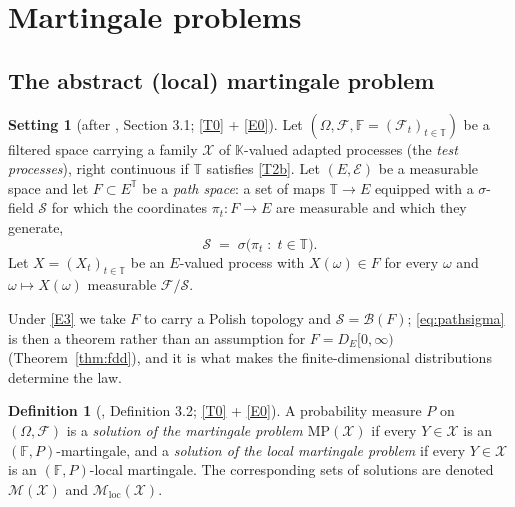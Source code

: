 \documentclass[11pt,a4paper]{article}
\theoremstyle{plain}
\theoremstyle{definition}
\newtheorem{definition}[theorem]{Definition}
\newtheorem{setting}[theorem]{Setting}
\theoremstyle{remark}
\newcommand{\T}{\mathbb{T}}                     %
\newcommand{\Bor}{\mathcal{B}}                 %
\newcommand{\DE}{D_E[0,\infty)}
\newcommand{\Filt}{\mathcal{F}}
\newcommand{\K}{\mathbb{K}}
\newcommand{\XX}{\mathcal{X}}                  %
\newcommand{\MP}{\mathrm{MP}}
\newcommand{\Msol}{\mathcal{M}}
\newcommand{\CPS}{\cite{CPS23}}
\begin{document}
\section{Martingale problems}
\label{sec:MP}

\subsection{The abstract (local) martingale problem}
\label{ssec:absMP}

\begin{setting}[after \CPS, Section 3.1; \eqref{T0} + \eqref{E0}]
  \label{set:abstract}
  Let $(\Omega, \Filt, \mathbb{F} = (\Filt_t)_{t \in \T})$ be a filtered space
  carrying a family $\XX$ of $\K$-valued adapted processes (the \emph{test
  processes}), right continuous if $\T$ satisfies \eqref{T2b}.  Let $(E,\mathcal{E})$
  be a measurable space and let $F \subset E^{\T}$ be a \emph{path space}: a set
  of maps $\T \to E$ equipped with a $\sigma$-field $\mathcal{S}$ for which the
  coordinates $\pi_t : F \to E$ are measurable and which they generate,
  \begin{equation}
    \label{eq:pathsigma}
    \mathcal{S} \;=\; \sigma\bigl( \pi_t \;:\; t \in \T \bigr) .
  \end{equation}
  Let $X = (X_t)_{t \in \T}$ be an $E$-valued process with $X(\omega) \in F$ for
  every $\omega$ and $\omega \mapsto X(\omega)$ measurable
  $\Filt / \mathcal{S}$.

  Under \eqref{E3} we take $F$ to carry a Polish topology and
  $\mathcal{S} = \Bor(F)$; \eqref{eq:pathsigma} is then a theorem rather than an
  assumption for $F = \DE$ (Theorem~\ref{thm:fdd}), and it is what makes the
  finite-dimensional distributions determine the law.
\end{setting}

\begin{definition}[\CPS, Definition 3.2; \eqref{T0} + \eqref{E0}]
  \label{def:absMP}
  A probability measure $P$ on $(\Omega, \Filt)$ is a \emph{solution of the
  martingale problem $\MP(\XX)$} if every $Y \in \XX$ is an
  $(\mathbb{F},P)$-martingale, and a \emph{solution of the local martingale
  problem} if every $Y \in \XX$ is an $(\mathbb{F},P)$-local martingale.  The
  corresponding sets of solutions are denoted $\Msol(\XX)$ and
  $\Msol_{\mathrm{loc}}(\XX)$.
\end{definition}
\end{document}
